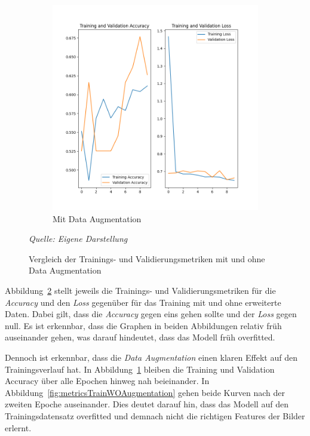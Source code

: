 \begin{figure}[H]
\begin{subfigure}[b]{0.49\textwidth}
        \includegraphics[width=\textwidth]{abbildungen/loss_train_val.png}
        \caption{Mit Data Augmentation}\label{fig:metricsTrainWAugmentation}
    \end{subfigure}
    \caption{Vergleich der Trainings- und Validierungsmetriken mit und ohne Data Augmentation}\label{fig:metricsTrain}
    \textit{Quelle: Eigene Darstellung}
    \\
\end{figure}
Abbildung~\ref{fig:metricsTrain} stellt jeweils die Trainings- und Validierungsmetriken für die \textit{Accuracy} und den \textit{Loss} gegenüber für das Training mit und ohne erweiterte Daten.
Dabei gilt, dass die \textit{Accuracy} gegen eins gehen sollte und der \textit{Loss} gegen null.
Es ist erkennbar, dass die Graphen in beiden Abbildungen relativ früh auseinander gehen, was darauf hindeutet, dass das Modell früh overfitted.

Dennoch ist erkennbar, dass die \textit{Data Augmentation} einen klaren Effekt auf den Trainingsverlauf hat. In Abbildung~\ref{fig:metricsTrainWAugmentation} bleiben die Training und Validation Accuracy über alle Epochen hinweg nah beieinander.
In Abbildung~\ref{fig:metricsTrainWOAugmentation} gehen beide Kurven nach der zweiten Epoche auseinander. Dies deutet darauf hin, dass das Modell auf den Trainingsdatensatz overfitted und demnach nicht die richtigen Features der Bilder erlernt.

